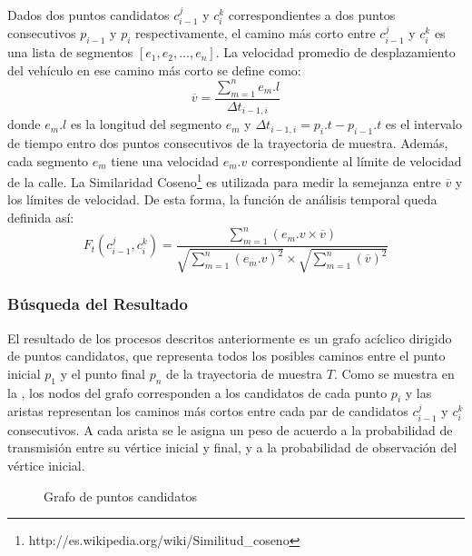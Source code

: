 Dados dos puntos candidatos $c_{i-1}^{j}$ y $c_{i}^{k}$ correspondientes a dos puntos consecutivos $p_{i-1}$ y $p_i$ respectivamente, el camino más corto entre $c_{i-1}^{j}$ y $c_{i}^{k}$ es una lista de segmentos $[e_1, e_2, \dots, e_n]$. La velocidad promedio de desplazamiento del vehículo en ese camino más corto se define como:
\begin{equation}
\overline{v} = \frac { \sum_{m=1}^{n} {e_m.l} }{ \Delta t_{i-1, i} }
\end{equation}
donde $e_m.l$ es la longitud del segmento $e_m$ y $\Delta t_{i-1, i} = p_i.t - p_{i-1}.t$ es el intervalo de tiempo entro dos puntos consecutivos de la trayectoria de muestra. Además, cada segmento $e_m$ tiene una velocidad $e_m.v$ correspondiente al límite de velocidad de la calle. La Similaridad Coseno\footnote{http://es.wikipedia.org/wiki/Similitud\_coseno} es utilizada para medir la semejanza entre $\overline{v}$ y los límites de velocidad. De esta forma, la función de análisis temporal queda definida así:
\begin{equation} \label{funcion_temporal}
F_{ t }(c_{ i-1 }^{ j },c_{ i }^{ k })=\frac { \sum _{ m=1 }^{ n }{ (e_{ m }.v\times \overline { v } ) }  }{ \sqrt { \sum _{ m=1 }^{ n }{ (e_{ m }.v)^{ 2 } }  } \times \sqrt { \sum _{ m=1 }^{ n }{ (\overline { v } )^{ 2 } }  }  } 
\end{equation}

\subsubsection{Búsqueda del Resultado}

\label{busqueda_de_resultado}
El resultado de los procesos descritos anteriormente es un grafo acíclico dirigido de puntos candidatos, que representa todos los posibles caminos entre el punto inicial $p_1$ y el punto final $p_n$ de la trayectoria de muestra $T$. Como se muestra en la , los nodos del grafo corresponden a los candidatos de cada punto $p_i$ y las aristas representan los caminos más cortos entre cada par de candidatos $c_{i-1}^j$ y $c_i^k$ consecutivos. A cada arista se le asigna un peso de acuerdo a la probabilidad de transmisión entre su vértice inicial y final, y a la probabilidad de observación del vértice inicial.

\begin{figure}[h*]
	\centering
	
	\caption{\label{fig:grafo_de_candidatos} Grafo de puntos candidatos}	
\end{figure}

